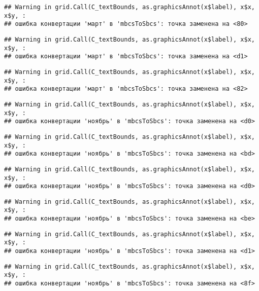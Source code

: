 \documentclass[
]{article}
\begin{document}
\begin{verbatim}
## Warning in grid.Call(C_textBounds, as.graphicsAnnot(x$label), x$x, x$y, :
## ошибка конвертации 'март' в 'mbcsToSbcs': точка заменена на <80>
\end{verbatim}

\begin{verbatim}
## Warning in grid.Call(C_textBounds, as.graphicsAnnot(x$label), x$x, x$y, :
## ошибка конвертации 'март' в 'mbcsToSbcs': точка заменена на <d1>
\end{verbatim}

\begin{verbatim}
## Warning in grid.Call(C_textBounds, as.graphicsAnnot(x$label), x$x, x$y, :
## ошибка конвертации 'март' в 'mbcsToSbcs': точка заменена на <82>
\end{verbatim}

\begin{verbatim}
## Warning in grid.Call(C_textBounds, as.graphicsAnnot(x$label), x$x, x$y, :
## ошибка конвертации 'ноябрь' в 'mbcsToSbcs': точка заменена на <d0>
\end{verbatim}

\begin{verbatim}
## Warning in grid.Call(C_textBounds, as.graphicsAnnot(x$label), x$x, x$y, :
## ошибка конвертации 'ноябрь' в 'mbcsToSbcs': точка заменена на <bd>
\end{verbatim}

\begin{verbatim}
## Warning in grid.Call(C_textBounds, as.graphicsAnnot(x$label), x$x, x$y, :
## ошибка конвертации 'ноябрь' в 'mbcsToSbcs': точка заменена на <d0>
\end{verbatim}

\begin{verbatim}
## Warning in grid.Call(C_textBounds, as.graphicsAnnot(x$label), x$x, x$y, :
## ошибка конвертации 'ноябрь' в 'mbcsToSbcs': точка заменена на <be>
\end{verbatim}

\begin{verbatim}
## Warning in grid.Call(C_textBounds, as.graphicsAnnot(x$label), x$x, x$y, :
## ошибка конвертации 'ноябрь' в 'mbcsToSbcs': точка заменена на <d1>
\end{verbatim}

\begin{verbatim}
## Warning in grid.Call(C_textBounds, as.graphicsAnnot(x$label), x$x, x$y, :
## ошибка конвертации 'ноябрь' в 'mbcsToSbcs': точка заменена на <8f>
\end{verbatim}
\end{document}
